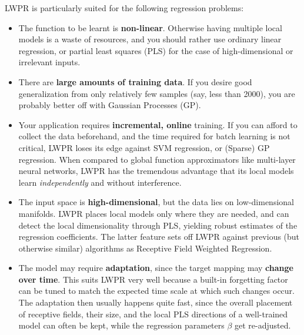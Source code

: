 \documentclass[11pt,a4paper]{article}
\begin{document}
LWPR is particularly suited for the following regression
problems:
\begin{itemize}
\item The function to be learnt is \textbf{non-linear}. Otherwise
      having multiple local models is a waste of resources, and
      you should rather use ordinary linear regression, or 
      partial least squares (PLS) for the case of 
      high-dimensional or irrelevant inputs.
      
\item There are \textbf{large amounts of training data}. If you
      desire good generalization from only relatively few
      samples (say, less than 2000), you are probably better off
      with Gaussian Processes (GP).
      
\item Your application requires \textbf{incremental, online} training.
      If you can afford to collect the data beforehand, and the time
      required for batch learning is not critical, LWPR loses its
      edge against SVM regression, or (Sparse) GP regression. When
      compared to global function approximators like multi-layer 
      neural networks, LWPR has the tremendous advantage that its 
      local models learn \emph{independently} and without interference.
      
\item The input space is \textbf{high-dimensional}, but the data 
      lies on low-dimensional manifolds. LWPR places local models
      only where they are needed, and can detect the local 
      dimensionality through PLS, yielding robust estimates of
      the regression coefficients. The latter feature sets off LWPR
      against previous (but otherwise similar) algorithms as 
      Receptive Field Weighted Regression.
      
\item The model may require \textbf{adaptation}, since the target
      mapping may \textbf{change over time}. This suits LWPR very
      well because a built-in forgetting factor can be tuned to
      match the expected time scale at which such changes occur.
      The adaptation then usually happens quite fast, since the
      overall placement of receptive fields, their size, and 
      the local PLS directions of a well-trained model can
      often be kept, while the regression parameters $\beta$
      get re-adjusted.
          
\end{itemize}
\end{document}
